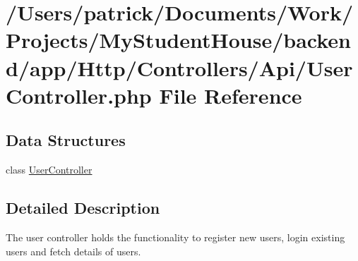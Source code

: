 \hypertarget{_user_controller_8php}{}\section{/\+Users/patrick/\+Documents/\+Work/\+Projects/\+My\+Student\+House/backend/app/\+Http/\+Controllers/\+Api/\+User\+Controller.php File Reference}
\label{_user_controller_8php}
\subsection*{Data Structures}
\begin{DoxyCompactItemize}
\item 
class \mbox{\hyperlink{class_app_1_1_http_1_1_controllers_1_1_a_p_i_1_1_user_controller}{User\+Controller}}
\end{DoxyCompactItemize}


\subsection{Detailed Description}
The user controller holds the functionality to register new users, login existing users and fetch details of users. 